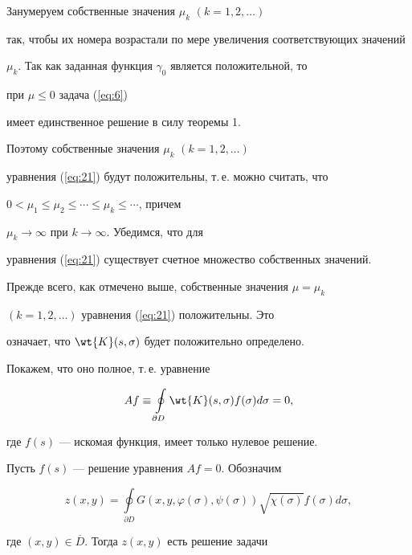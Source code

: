 Занумеруем собственные значения $\mu_k$ $ ({k=1,2,\dotsc})$ 


так, чтобы их номера возрастали по мере увеличения соответствующих значений 


$\mu_k$. Так как заданная функция $\gamma_0$ является положительной, то 


при $\mu \le 0$ задача (\ref{eq:6}) 


имеет единственное решение в силу теоремы 1.


Поэтому собственные значения $\mu_k$ $ ({k=1,2,\dotsc})$ 


уравнения (\ref{eq:21}) будут положительны, т.\,е. можно считать, что


$0 < \mu_1 \le \mu_2 \le \dotsb \le \mu_k \le \dotsb$, причем


$\mu_k \to \infty$ при $k \to \infty $. Убедимся, что для 


уравнения (\ref{eq:21}) существует счетное множество собственных значений.





Прежде всего, как отмечено выше, собственные значения $\mu=\mu_k$


$ ({k=1,2,\dotsc})$ уравнения (\ref{eq:21}) положительны. Это


означает, что $\wt {K} ({s,\sigma })$ будет положительно определено.





Покажем, что оно полное, т.\,е. уравнение


\begin{equation}\label{eq:22}


Af \equiv \oint\limits_{\partial D} {\wt {K} ({s,\sigma })


f(\sigma)d\sigma=0} ,


\end{equation}


где $f (s)$ --- искомая функция, имеет только нулевое решение.


Пусть $f (s)$ --- решение уравнения $Af=0$. Обозначим


\begin{equation}\label{eq:23}


z ({x,y})=\oint\limits_{\partial D} {G ({x,y,\varphi 


(\sigma),\psi (\sigma)})\sqrt {\chi (\sigma)} f (\sigma)d\sigma },


\end{equation}


где $ ({x,y}) \in \overline D $. Тогда $z ({x,y})$ есть решение задачи


